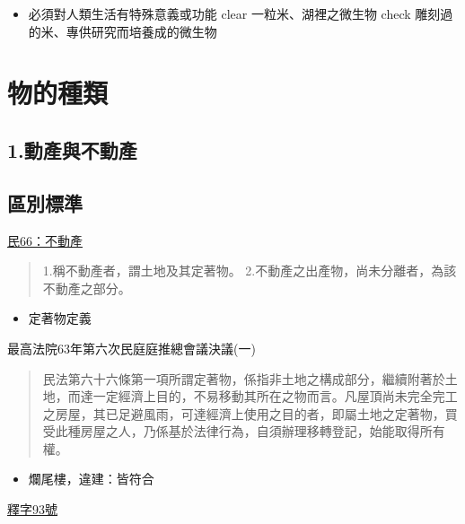 \documentclass[
]{book}
\providecommand{\tightlist}{%
  \setlength{\itemsep}{0pt}\setlength{\parskip}{0pt}}
\begin{document}
\begin{itemize}
\tightlist
\item
  必須對人類生活有特殊意義或功能
  clear
  一粒米、湖裡之微生物
  check
  雕刻過的米、專供研究而培養成的微生物
\end{itemize}

\pagebreak

\hypertarget{ux7269ux7684ux7a2eux985e}{%
\section{物的種類}\label{ux7269ux7684ux7a2eux985e}}

\hypertarget{ux52d5ux7522ux8207ux4e0dux52d5ux7522}{%
\subsection{1.動產與不動產}\label{ux52d5ux7522ux8207ux4e0dux52d5ux7522}}

\hypertarget{ux5340ux5225ux6a19ux6e96}{%
\subsection{區別標準}\label{ux5340ux5225ux6a19ux6e96}}

\href{https://law.moj.gov.tw/LawClass/LawSingle.aspx?pcode=B0000001\&flno=66}{民66：不動產}

\begin{quote}
1.稱不動產者，謂土地及其定著物。
2.不動產之出產物，尚未分離者，為該不動產之部分。
\end{quote}

\begin{itemize}
\tightlist
\item
  定著物定義
\end{itemize}

最高法院63年第六次民庭庭推總會議決議(一)

\begin{quote}
民法第六十六條第一項所謂定著物，係指非土地之構成部分，繼續附著於土地，而達一定經濟上目的，不易移動其所在之物而言。凡屋頂尚未完全完工之房屋，其已足避風雨，可達經濟上使用之目的者，即屬土地之定著物，買受此種房屋之人，乃係基於法律行為，自須辦理移轉登記，始能取得所有權。
\end{quote}

\begin{itemize}
\tightlist
\item
  爛尾樓，違建：皆符合
\end{itemize}

\href{https://cons.judicial.gov.tw/docdata.aspx?fid=100\&id=310274}{釋字93號}
\end{document}
